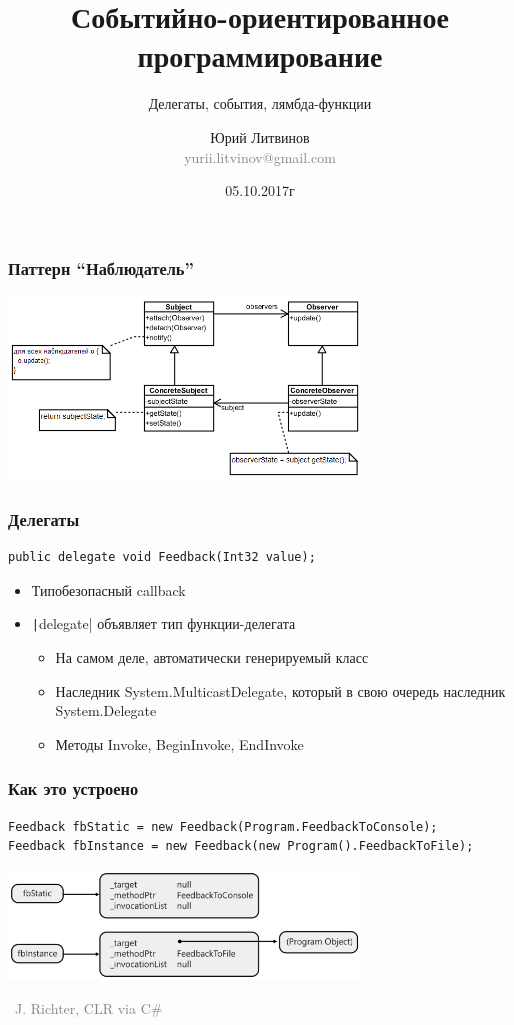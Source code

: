 \documentclass[xetex,mathserif,serif]{beamer}
\title{Событийно-ориентированное программирование}
\subtitle{Делегаты, события, лямбда-функции}
\author[Юрий Литвинов]{Юрий Литвинов\\\small{\textcolor{gray}{yurii.litvinov@gmail.com}}}
\date{05.10.2017г}
\newcommand{\attribution}[1] {
\vspace{-5mm}\begin{flushright}\begin{scriptsize}\textcolor{gray}{\textcopyright\, #1}\end{scriptsize}\end{flushright}
}
\begin{document}
	\frame{\titlepage}

	\begin{frame}
		\frametitle{Паттерн ``Наблюдатель''}
		\begin{center}
			\includegraphics[width=0.7\textwidth]{observer.png}
		\end{center}
	\end{frame}

	\begin{frame}[fragile]
		\frametitle{Делегаты}
		\begin{verbatim}
public delegate void Feedback(Int32 value);
		\end{verbatim}
		\begin{itemize}
			\item Типобезопасный callback
			\item \texttt|delegate| объявляет тип функции-делегата
			\begin{itemize}
				\item На самом деле, автоматически генерируемый класс
				\item Наследник System.MulticastDelegate, который в свою очередь наследник System.Delegate
				\item Методы Invoke, BeginInvoke, EndInvoke
			\end{itemize}
		\end{itemize}
	\end{frame}

	\begin{frame}[fragile]
		\frametitle{Как это устроено}
		\begin{verbatim}
Feedback fbStatic = new Feedback(Program.FeedbackToConsole);
Feedback fbInstance = new Feedback(new Program().FeedbackToFile);
		\end{verbatim}
		\begin{center}
			\includegraphics[width=0.7\textwidth]{delegates.png}
			\attribution{J. Richter, CLR via C\#}
		\end{center}
	\end{frame}
\end{document}

